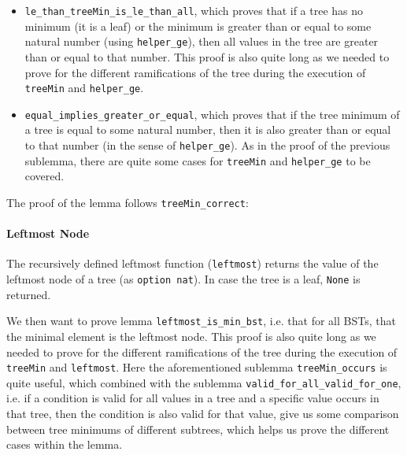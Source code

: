 \documentclass[a4paper]{article}
\begin{document}
\begin{itemize}
\begin{itemize}
        \item \texttt{le\_than\_treeMin\_is\_le\_than\_all}, which proves that if a tree has no minimum (it is a leaf) or the minimum is greater than or equal to some natural number (using \texttt{helper\_ge}), then all values in the tree are greater than or equal to that number. This proof is also quite long as we needed to prove for the different ramifications of the tree during the execution of \texttt{treeMin} and \texttt{helper\_ge}.
        
        
        \item \texttt{equal\_implies\_greater\_or\_equal}, which proves that if the tree minimum of a tree is equal to some natural number, then it is also greater than or equal to that number (in the sense of \texttt{helper\_ge}). As in the proof of the previous sublemma, there are quite some cases for \texttt{treeMin} and \texttt{helper\_ge} to be covered.
        
    \end{itemize}
\end{itemize}

The proof of the lemma follows \texttt{treeMin\_correct}:


 
\paragraph{Leftmost Node}

The recursively defined leftmost function (\texttt{leftmost}) returns the value of the leftmost node of a tree (as \texttt{option nat}). In case the tree is a leaf, \texttt{None} is returned.



We then want to prove lemma \texttt{leftmost\_is\_min\_bst}, i.e. that for all BSTs, that the minimal element is the leftmost node. This proof is also quite long as we needed to prove for the different ramifications of the tree during the execution of \texttt{treeMin} and \texttt{leftmost}. Here the aforementioned sublemma \texttt{treeMin\_occurs} is quite useful, which combined with the sublemma \texttt{valid\_for\_all\_valid\_for\_one}, i.e. if a condition is valid for all values in a tree and a specific value occurs in that tree, then the condition is also valid for that value, give us some comparison between tree minimums of different subtrees, which helps us prove the different cases within the lemma.
\end{document}
